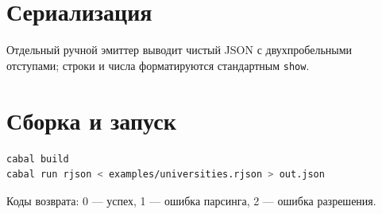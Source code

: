 \documentclass[a4paper,11pt]{article}
\begin{document}
\section{Сериализация}

Отдельный ручной эмиттер выводит чистый JSON с двухпробельными
отступами; строки и числа форматируются стандартным \texttt{show}.

\section{Сборка и запуск}

\begin{lstlisting}[language=sh]
cabal build
cabal run rjson < examples/universities.rjson > out.json
\end{lstlisting}

Коды возврата: 0 — успех, 1 — ошибка парсинга, 2 — ошибка разрешения.
\end{document}
